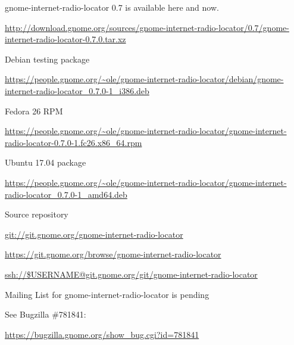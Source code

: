\documentclass[20pt,landscape]{foils}
\begin{document}

\begin{list1}
\item gnome-internet-radio-locator 0.7 is available here and now.
  \begin{list2}
  \item \begin{tiny}\url{http://download.gnome.org/sources/gnome-internet-radio-locator/0.7/gnome-internet-radio-locator-0.7.0.tar.xz}\end{tiny}
  \end{list2}
\item Debian testing package
  \begin{list2}
  \item \begin{tiny}\url{https://people.gnome.org/~ole/gnome-internet-radio-locator/debian/gnome-internet-radio-locator_0.7.0-1_i386.deb}\end{tiny}
  \end{list2}
\item Fedora 26 RPM
  \begin{list2}
  \item \begin{tiny}\url{https://people.gnome.org/~ole/gnome-internet-radio-locator/gnome-internet-radio-locator-0.7.0-1.fc26.x86_64.rpm}\end{tiny}
  \end{list2}
\item Ubuntu 17.04 package
  \begin{list2}
  \item \begin{tiny}\url{https://people.gnome.org/~ole/gnome-internet-radio-locator/gnome-internet-radio-locator_0.7.0-1_amd64.deb}\end{tiny}
  \end{list2}
\item Source repository
  \begin{list2}
    \item \url{git://git.gnome.org/gnome-internet-radio-locator}
    \item \url{https://git.gnome.org/browse/gnome-internet-radio-locator}
    \item \url{ssh://$USERNAME@git.gnome.org/git/gnome-internet-radio-locator}
  \end{list2}
\item Mailing List for gnome-internet-radio-locator is pending\\
  \begin{list2}
  \item See Bugzilla \#781841: \begin{tiny}\url{https://bugzilla.gnome.org/show_bug.cgi?id=781841}\begin{verbatim}


\end{verbatim}
\end{tiny}
\end{list2}
\end{list1}
\end{document}
